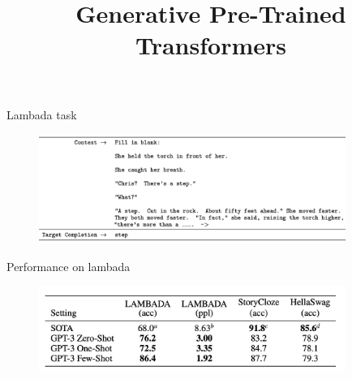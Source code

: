



\newcommand{\titlefigure}{figure/73-gpt3.jpg}

\newcommand{\learninggoals}{
\item Overview on relevant tasks and benchmarks
\item GPT-3's performance in X-shot settings}

\def\myblue#1{\textcolor{texblue}{#1}}

\title{Generative Pre-Trained Transformers}
\date{}




\begin{vbframe}{Lambada task}

\vfill

	\begin{figure}
		\centering
		\includegraphics[width=10cm]{figure/lambadaformat.png}\\
	\end{figure}

\vfill

\end{vbframe}


\begin{vbframe}{Performance on lambada}

\vfill

	\begin{figure}
		\centering
		\includegraphics[width=10cm]{figure/lambadaperf.png}\\
	\end{figure}

\vfill

\end{vbframe}

